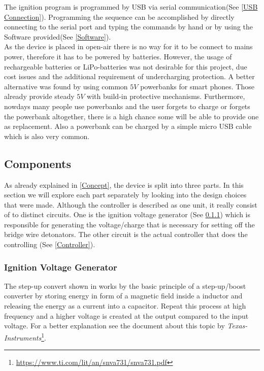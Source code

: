 \noindent The ignition program is programmed by USB via serial communication(See \cref{USB Connection}). Programming the sequence can be accomplished by directly connecting to the serial port and typing the commands by hand or by using the Software provided(See \cref{Software}).\\

\noindent As the device is placed in open-air there is no way for it to be connect to mains power, therefore it has to be powered by batteries. However, the usage of rechargeable batteries or LiPo-batteries was not desirable for this project, due cost issues and the additional requirement of undercharging protection. A better alternative was found by using common $5V$ powerbanks for smart phones. Those already provide steady $5V$ with build-in protective mechanisms. Furthermore, nowdays many people use powerbanks and the user forgets to charge or forgets the powerbank altogether, there is a high chance some will be able to provide one as replacement. Also a powerbank can be charged by a simple micro USB cable which is also very common.





\pagebreak

\subsection{Components}
As already explained in \cref{Concept}, the device is split into three parts. In this section we will explore each part separately by looking into the design choices that were made. Although the controller is described as one unit, it really consist  of to distinct circuits. One is the ignition voltage generator (See \cref{Ignition Voltage Generator}) which is responsible for generating the voltage/charge that is necessary for setting off the bridge wire detonators. The other circuit is the actual controller that does the controlling (See \cref{Controller}).


\subsubsection{Ignition Voltage Generator}
\label{Ignition Voltage Generator}



\noindent The step-up convert shown in  works by the basic principle of a step-up/boost converter by storing energy in form of a magnetic field inside a inductor and releasing the energy as a current into a capacitor. Repeat this process at high frequency and a higher voltage is created at the output compared to the input voltage. For a better explanation see the document about this topic by \textit{Texas-Instruments}\footnote{\url{https://www.ti.com/lit/an/snva731/snva731.pdf}}.


